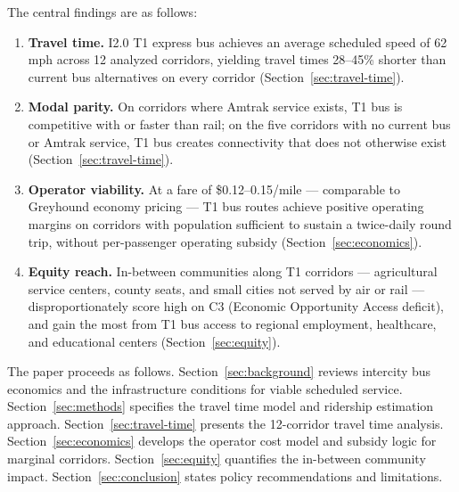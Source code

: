 The central findings are as follows:

\begin{enumerate}
  \item \textbf{Travel time.} I2.0 T1 express bus achieves an average scheduled speed of 62 mph across 12 analyzed corridors, yielding travel times 28--45\% shorter than current bus alternatives on every corridor (Section~\ref{sec:travel-time}).

  \item \textbf{Modal parity.} On corridors where Amtrak service exists, T1 bus is competitive with or faster than rail; on the five corridors with no current bus or Amtrak service, T1 bus creates connectivity that does not otherwise exist (Section~\ref{sec:travel-time}).

  \item \textbf{Operator viability.} At a fare of \$0.12--0.15/mile --- comparable to Greyhound economy pricing --- T1 bus routes achieve positive operating margins on corridors with population sufficient to sustain a twice-daily round trip, without per-passenger operating subsidy (Section~\ref{sec:economics}).

  \item \textbf{Equity reach.} In-between communities along T1 corridors --- agricultural service centers, county seats, and small cities not served by air or rail --- disproportionately score high on C3 (Economic Opportunity Access deficit), and gain the most from T1 bus access to regional employment, healthcare, and educational centers (Section~\ref{sec:equity}).
\end{enumerate}

The paper proceeds as follows. Section~\ref{sec:background} reviews intercity bus economics and the infrastructure conditions for viable scheduled service. Section~\ref{sec:methods} specifies the travel time model and ridership estimation approach. Section~\ref{sec:travel-time} presents the 12-corridor travel time analysis. Section~\ref{sec:economics} develops the operator cost model and subsidy logic for marginal corridors. Section~\ref{sec:equity} quantifies the in-between community impact. Section~\ref{sec:conclusion} states policy recommendations and limitations.
